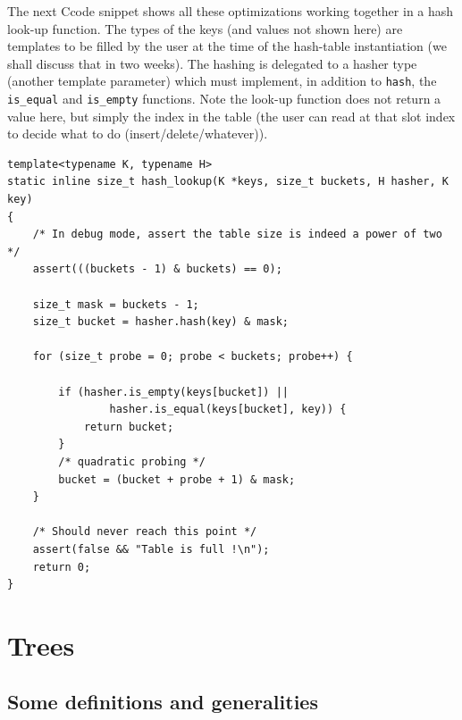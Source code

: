\documentclass[12pt]{article}
\theoremstyle{plain}
\theoremstyle{remark}
\newcommand{\cpp}{C\nolinebreak\hspace{-.05em}\raisebox{.4ex}{\tiny\bf +}\nolinebreak\hspace{-.10em}\raisebox{.4ex}{\tiny\bf +}}
\begin{document}
The next \cpp code snippet shows all these optimizations working together in a hash
look-up function. The types of the keys (and values not shown here) are templates 
to be filled by the user at the time of the hash-table instantiation (we shall
discuss that in two weeks). The hashing is delegated to a hasher type (another
template parameter) which must implement, in addition to {\tt hash}, the {\tt
is\_equal} and {\tt is\_empty} functions. Note the look-up function does not
return a value here, but simply the index in the table (the user can read at that
slot index to decide what to do (insert/delete/whatever)).
	


\begin{lstlisting}[style=C]
template<typename K, typename H>
static inline size_t hash_lookup(K *keys, size_t buckets, H hasher, K key)
{
	/* In debug mode, assert the table size is indeed a power of two */
	assert(((buckets - 1) & buckets) == 0);
	
	size_t mask = buckets - 1;
	size_t bucket = hasher.hash(key) & mask;

	for (size_t probe = 0; probe < buckets; probe++) {

		if (hasher.is_empty(keys[bucket]) || 
				hasher.is_equal(keys[bucket], key)) {
			return bucket;
		}
		/* quadratic probing */
		bucket = (bucket + probe + 1) & mask;
	}
	
	/* Should never reach this point */
	assert(false && "Table is full !\n"); 	
	return 0;
}
\end{lstlisting}


\pagebreak
\section{Trees}


\subsection{Some definitions and generalities}
\end{document}
